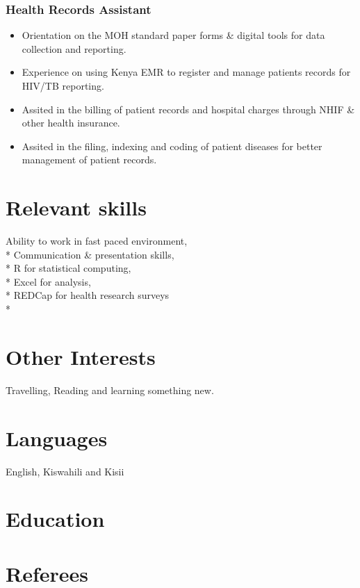 \documentclass{brian_ats}
\begin{document}
\subsubsection{Health Records Assistant}
\begin{itemize}
   \item Orientation on the MOH standard paper forms \& digital tools for data collection and reporting.
   \item Experience on using Kenya EMR to register and manage patients records for HIV/TB reporting.
   \item Assited in the billing of patient records and hospital charges through NHIF \& other health insurance. 
   \item Assited in the filing, indexing and coding of patient diseases for better management of patient records.
\end{itemize}

\section{Relevant skills}
Ability to work in fast paced environment, \\*
Communication \& presentation skills, \\*
R for statistical computing, \\*
Excel for analysis, \\*
REDCap for health research surveys\\*

\section{Other Interests}
Travelling, Reading and learning something new.
\section{Languages}
English, Kiswahili and Kisii
\section{Education}

\section{Referees}
\end{document}
